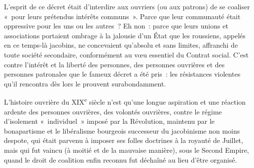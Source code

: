 \documentclass[french,twoside]{book} %
\newcommand{\astermono}{\medskip\centerline{\color{rubric}\large\selectfont{\syms ✻}}\medskip\par}%
\begin{document}
L’esprit de ce décret était d’interdire aux ouvriers (ou aux patrons) de se coaliser « pour leurs prétendus intérêts communs ». Parce que leur communauté était oppressive pour les uns ou les autres ? Eh non : parce que leurs unions et associations portaient ombrage à la jalousie d’un État que les roussiens, appelés en ce temps-là jacobins, ne concevaient qu’absolu et sans limites, affranchi de toute société secondaire, conformément au vœu essentiel du Contrat social. C’est contre l’intérêt et la liberté des personnes, des personnes ouvrières et des personnes patronales que le fameux décret a été pris : les résistances violentes qu’il rencontra dès lors le prouvent surabondamment.\par

\astermono

\noindent L’histoire ouvrière du XIX\textsuperscript{e} siècle n’est qu’une longue aspiration et une réaction ardente des personnes ouvrières, des volontés ouvrières, contre le régime d’isolement « individuel » imposé par la Révolution, maintenu par le bonapartisme et le libéralisme bourgeois successeur du jacobinisme non moins despote, qui était parvenu à imposer ses folles doctrines à la royauté de Juillet, mais qui fut vaincu (à moitié et de la mauvaise manière), sous le Second Empire, quand le droit de coalition enfin reconnu fut déchaîné au lieu d’être organisé.\par

\astermono
\end{document}
